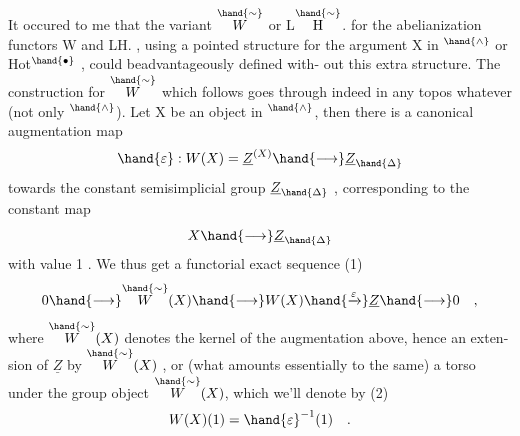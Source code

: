 It occured to me that the variant $\overset{\hand{\sim}}{W}$ or L$\overset{\hand{\sim}}{\mathrm{H}}$. 
for the abelianization functors W and LH. ,  using a pointed structure
for the argument X in \hand{$\Delta$}$^{\hand{\wedge}}$ or Hot$^{\hand{\bullet}}$ , could beadvantageously defined with-%
out this extra structure. The construction for $\overset{\hand{\sim}}{W}$ which follows goes
through indeed in any topos whatever (not only \hand{$\Delta$}$^{\hand{\wedge}}$). Let X be an object
in \hand{$\Delta$}$^{\hand{\wedge}}$, then there is a canonical augmentation map
\[ \hand{\varepsilon} : W(X) = \underline{Z}^{(X)} \hand{\longrightarrow} \underline{Z}_{\hand{\Delta}} \]
towards the constant semisimplicial group $\underline{Z}_{\hand{\Delta}}$ , corresponding to the
constant map
\[ X \hand{\longrightarrow} \underline{Z}_{\hand{\Delta}} \]
with value 1 . We thus get a functorial exact sequence
(1) \[ 0 \hand{\longrightarrow} \overset{\hand{\sim}}{W}(X) \hand{\longrightarrow} W(X) \hand{\xrightarrow{\varepsilon}} \underline{Z} \hand{\longrightarrow} 0 \quad , \]
where $\overset{\hand{\sim}}{W}(X)$ denotes the kernel of the augmentation above, hence an exten-%
sion of $\underline{Z}$ by $\overset{\hand{\sim}}{W}(X)$ , or (what amounts essentially to the same) a torso
under the group object $\overset{\hand{\sim}}{W}(X)$, which we'll denote by
(2) \[ W(X)(1) = \hand{\varepsilon}^{-1}(1) \quad . \]


